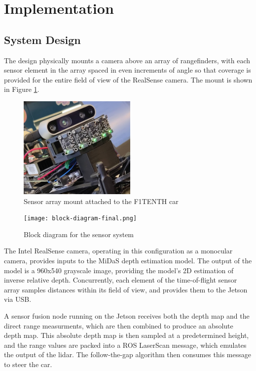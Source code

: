 \documentclass[conference]{IEEEtran}
\begin{document}
\section{Implementation}

\subsection{System Design}

The design physically mounts a camera above an array of rangefinders, with each
sensor element in the array spaced in even increments of angle so that coverage
is provided for the entire field of view of the RealSense camera. The mount is
shown in Figure \ref{fig:mount}.

\begin{figure}
\centering
\includegraphics[scale=1.00]{mount.png}
\caption{Sensor array mount attached to the F1TENTH car}
\label{fig:mount}
\end{figure}


\begin{figure}
\centering
\texttt{[image: block-diagram-final.png]}
\caption{Block diagram for the sensor system}
\label{fig:block-diagram}
\end{figure}


The Intel RealSense camera, operating in this configuration as a monocular
camera, provides inputs to the MiDaS depth estimation model. The output of the
model is a 960x540 grayscale image, providing the model's 2D estimation of
inverse relative depth. Concurrently, each element of the time-of-flight sensor
array samples distances within its field of view, and provides them to the
Jetson via USB.

A sensor fusion node running on the Jetson receives both the depth map and the
direct range measurments, which are then combined to produce an absolute depth
map. This absolute depth map is then sampled at a predetermined height, and the
range values are packed into a ROS LaserScan message, which emulates the output
of the lidar. The follow-the-gap algorithm then consumes this message to steer
the car.
\end{document}
